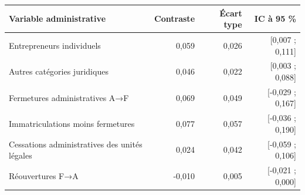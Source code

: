 \begin{tabularx}{\linewidth}{Xrrr}
\toprule
Variable administrative & Contraste & Écart type & IC à 95 \% \\
\midrule
Entrepreneurs individuels & 0,059 & 0,026 & [0,007 ; 0,111] \\
Autres catégories juridiques & 0,046 & 0,022 & [0,003 ; 0,088] \\
Fermetures administratives A→F & 0,069 & 0,049 & [-0,029 ; 0,167] \\
Immatriculations moins fermetures & 0,077 & 0,057 & [-0,036 ; 0,190] \\
Cessations administratives des unités légales & 0,024 & 0,042 & [-0,059 ; 0,106] \\
Réouvertures F→A & -0,010 & 0,005 & [-0,021 ; 0,000] \\
\bottomrule
\end{tabularx}
